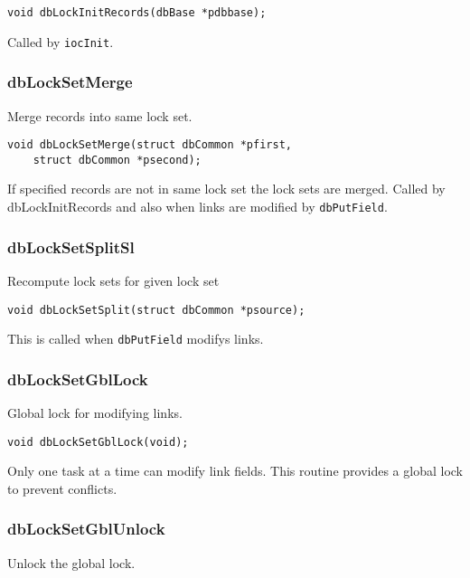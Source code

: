 \begin{verbatim}
void dbLockInitRecords(dbBase *pdbbase);
\end{verbatim}

Called by \verb|iocInit|.

\subsubsection{dbLockSetMerge}

Merge records into same lock set.

\begin{verbatim}
void dbLockSetMerge(struct dbCommon *pfirst,
    struct dbCommon *psecond);
\end{verbatim}

If specified records are not in same lock set the lock sets are merged. Called by dbLockInitRecords and also when links 
are modified by \verb|dbPutField|.

\subsubsection{dbLockSetSplitSl}

Recompute lock sets for given lock set

\begin{verbatim}
void dbLockSetSplit(struct dbCommon *psource);
\end{verbatim}

This is called when \verb|dbPutField| modifys links.

\subsubsection{dbLockSetGblLock}

Global lock for modifying links.

\begin{verbatim}
void dbLockSetGblLock(void);
\end{verbatim}

Only one task at a time can modify link fields. This routine provides a global lock to prevent conflicts.

\subsubsection{dbLockSetGblUnlock}

Unlock the global lock.


